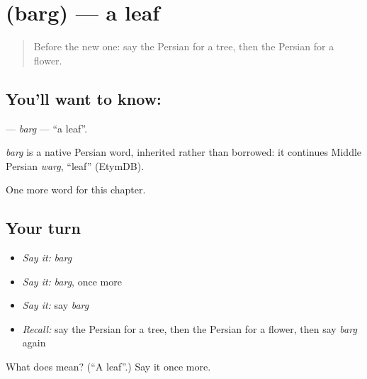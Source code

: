 \section[\texorpdfstring{\fa{برگ} (barg)}{برگ (barg)}]{ (barg) — a leaf}

\label{lesson:FA-C51-barg}



\begin{quote}
Before the new one: say the Persian for a tree, then the Persian for a flower.
\end{quote}

\subsection*{You'll want to know: }
\textbf{} — \emph{barg} — \textquotedblleft{}a leaf\textquotedblright{}.

\begin{cousinweb}
\emph{barg} is a native Persian word, inherited rather than borrowed: it continues Middle Persian \emph{warg}, \textquotedblleft{}leaf\textquotedblright{} (EtymDB).
\end{cousinweb}

\begin{grammarlens}[title={What you've built}]
One more word for this chapter.
\end{grammarlens}

\subsection*{Your turn}
\begin{itemize}
\raggedright
  \item \emph{Say it:} \emph{barg}
  \item \emph{Say it:} \emph{barg}, once more
  \item \emph{Say it:} say \emph{barg}
  \item \emph{Recall:} say the Persian for a tree, then the Persian for a flower, then say \emph{barg} again
\end{itemize}

\begin{tcolorbox}[breakable,colback=teal!4,colframe=teal!35!black,title={Before you move on}]
What does  mean? (\textquotedblleft{}A leaf\textquotedblright{}.) Say it once more.
\end{tcolorbox}
